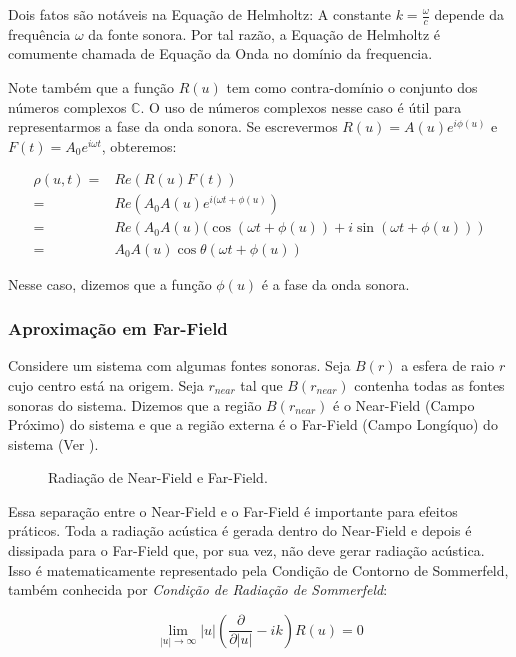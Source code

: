 Dois fatos são notáveis na Equação de Helmholtz: A constante $k = \frac{\omega}{c}$ depende da frequência $\omega$ da fonte sonora. Por tal razão, a Equação de Helmholtz é comumente chamada de Equação da Onda no domínio da frequencia.

Note também que a função $R(u)$ tem como contra-domínio o conjunto dos números complexos $\mathbb{C}$. O uso de números complexos nesse caso é útil para representarmos a fase da onda sonora. Se escrevermos $R(u) = A(u)e^{i\phi(u)}$ e $F(t) = A_0e^{i\omega t}$, obteremos:

\begin{eqnarray}
	\rho(u, t) =& Re\left( R(u)F(t) \right) \nonumber\\
	=& Re\left(A_0A(u) e^{i(\omega t + \phi(u)}\right) \nonumber\\
	=& Re\left(A_0A(u)(\cos (\omega t + \phi(u)) + i\sin (\omega t + \phi(u))\right) \nonumber\\
	=& A_0A(u)\cos \theta(\omega t + \phi(u))
\end{eqnarray}

Nesse caso, dizemos que a função $\phi(u)$ é a fase da onda sonora.

\subsubsection{Aproximação em Far-Field}

Considere um sistema com algumas fontes sonoras. Seja $B(r)$ a esfera de raio $r$ cujo centro está na origem. Seja $r_{near}$ tal que $B(r_{near})$ contenha todas as fontes sonoras do sistema. Dizemos que a região $B(r_{near})$ é o Near-Field (Campo Próximo) do sistema e que a região externa é o Far-Field (Campo Longíquo) do sistema (Ver ).

\begin{figure}[ht]
	\centering
	
	\caption[Radiação de Near-Field e Far-Field]{Radiação de Near-Field e Far-Field.}\label{fig:farfield}
\end{figure}

Essa separação entre o Near-Field e o Far-Field é importante para efeitos práticos. Toda a radiação acústica é gerada dentro do Near-Field e depois é dissipada para o Far-Field que, por sua vez, não deve gerar radiação acústica. Isso é matematicamente representado pela Condição de Contorno de Sommerfeld, também conhecida por \emph{Condição de Radiação de Sommerfeld}:

\begin{equation}
	\lim_{|u| \rightarrow \infty} |u| \left(\frac{\partial}{\partial |u|} - ik \right) R(u) = 0 \label{eq:sommerfeld_condition}
\end{equation}

